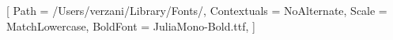 \usepackage{fontspec}
\usepackage{unicode-math}
\usepackage[utf8]{inputenc}

\setmonofont{JuliaMono-Regular.ttf}[
    Path = /Users/verzani/Library/Fonts/,
    Contextuals = NoAlternate,
    Scale = MatchLowercase,
    BoldFont = JuliaMono-Bold.ttf,
]
